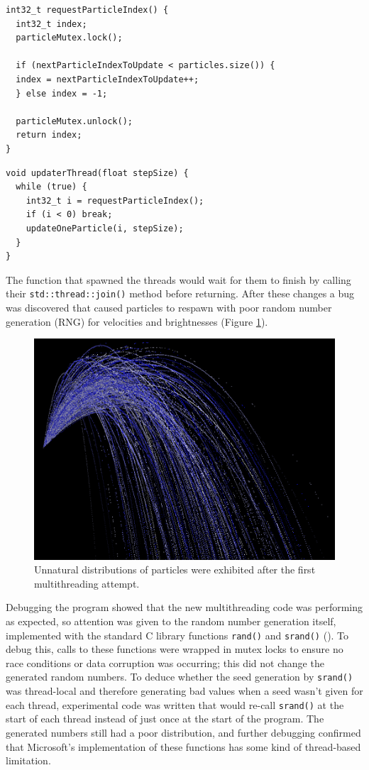 \documentclass[11pt, a4paper, twocolumn]{article}
\begin{document}
\begin{verbatim}
int32_t requestParticleIndex() {
  int32_t index;
  particleMutex.lock();
  
  if (nextParticleIndexToUpdate < particles.size()) {
  index = nextParticleIndexToUpdate++;
  } else index = -1;
  
  particleMutex.unlock();
  return index;
}
\end{verbatim}
\begin{verbatim}
void updaterThread(float stepSize) {
  while (true) {
    int32_t i = requestParticleIndex();
    if (i < 0) break;
    updateOneParticle(i, stepSize);
  }
}
\end{verbatim}

The function that spawned the threads would wait for them to finish by calling their \verb|std::thread::join()| method before returning. After these changes a bug was discovered that caused particles to respawn with poor random number generation (RNG) for velocities and brightnesses (Figure \ref{fig:randombug}).

\begin{figure}[h]
\includegraphics[width=\linewidth]{randombug}
\caption{Unnatural distributions of particles were exhibited after the first multithreading attempt.}
\label{fig:randombug}
\end{figure}

Debugging the program showed that the new multithreading code was performing as expected, so attention was given to the random number generation itself, implemented with the standard C library functions \verb|rand()| and \verb|srand()| (\citeyear{CLibRand}). To debug this, calls to these functions were wrapped in mutex locks to ensure no race conditions or data corruption was occurring; this did not change the generated random numbers. To deduce whether the seed generation by \verb|srand()| was thread-local and therefore generating bad values when a seed wasn't given for each thread, experimental code was written that would re-call \verb|srand()| at the start of each thread instead of just once at the start of the program. The generated numbers still had a poor distribution, and further debugging confirmed that Microsoft's implementation of these functions has some kind of thread-based limitation.
\end{document}
